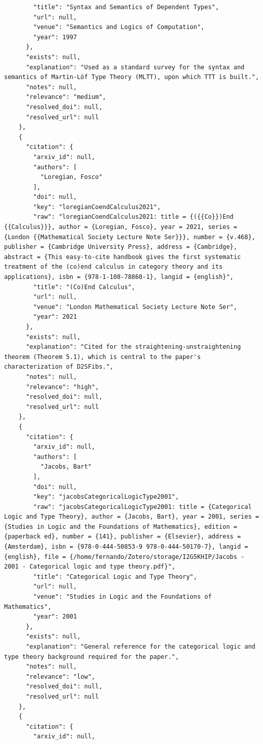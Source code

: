 \documentclass[11pt]{article}
\begin{document}
\begin{verbatim}
        "title": "Syntax and Semantics of Dependent Types",
        "url": null,
        "venue": "Semantics and Logics of Computation",
        "year": 1997
      },
      "exists": null,
      "explanation": "Used as a standard survey for the syntax and semantics of Martin-Löf Type Theory (MLTT), upon which TTT is built.",
      "notes": null,
      "relevance": "medium",
      "resolved_doi": null,
      "resolved_url": null
    },
    {
      "citation": {
        "arxiv_id": null,
        "authors": [
          "Loregian, Fosco"
        ],
        "doi": null,
        "key": "loregianCoendCalculus2021",
        "raw": "loregianCoendCalculus2021: title = {({{Co}})End {{Calculus}}}, author = {Loregian, Fosco}, year = 2021, series = {London {{Mathematical Society Lecture Note Ser}}}, number = {v.468}, publisher = {Cambridge University Press}, address = {Cambridge}, abstract = {This easy-to-cite handbook gives the first systematic treatment of the (co)end calculus in category theory and its applications}, isbn = {978-1-108-78860-1}, langid = {english}",
        "title": "(Co)End Calculus",
        "url": null,
        "venue": "London Mathematical Society Lecture Note Ser",
        "year": 2021
      },
      "exists": null,
      "explanation": "Cited for the straightening-unstraightening theorem (Theorem 5.1), which is central to the paper's characterization of D2SFibs.",
      "notes": null,
      "relevance": "high",
      "resolved_doi": null,
      "resolved_url": null
    },
    {
      "citation": {
        "arxiv_id": null,
        "authors": [
          "Jacobs, Bart"
        ],
        "doi": null,
        "key": "jacobsCategoricalLogicType2001",
        "raw": "jacobsCategoricalLogicType2001: title = {Categorical Logic and Type Theory}, author = {Jacobs, Bart}, year = 2001, series = {Studies in Logic and the Foundations of Mathematics}, edition = {paperback ed}, number = {141}, publisher = {Elsevier}, address = {Amsterdam}, isbn = {978-0-444-50853-9 978-0-444-50170-7}, langid = {english}, file = {/home/fernando/Zotero/storage/I2G5KHIP/Jacobs - 2001 - Categorical logic and type theory.pdf}",
        "title": "Categorical Logic and Type Theory",
        "url": null,
        "venue": "Studies in Logic and the Foundations of Mathematics",
        "year": 2001
      },
      "exists": null,
      "explanation": "General reference for the categorical logic and type theory background required for the paper.",
      "notes": null,
      "relevance": "low",
      "resolved_doi": null,
      "resolved_url": null
    },
    {
      "citation": {
        "arxiv_id": null,

\end{verbatim}
\end{document}
